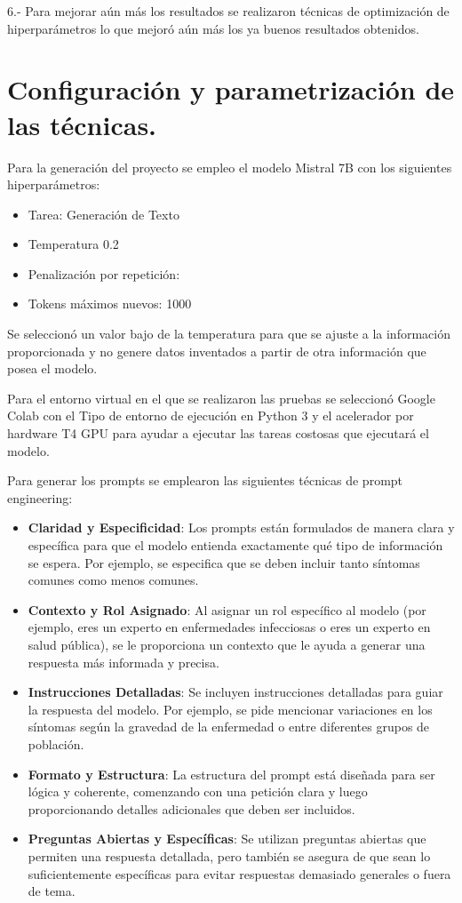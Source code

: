 6.- Para mejorar aún más los resultados se realizaron técnicas de optimización de hiperparámetros lo que mejoró aún más los ya buenos resultados obtenidos.


\section{Configuración y parametrización de las técnicas.}

Para la generación del proyecto se empleo el modelo Mistral 7B con los siguientes hiperparámetros: 

\begin{itemize}

    \item Tarea: Generación de Texto
    \item Temperatura 0.2
    \item Penalización por repetición: %
    \item Tokens máximos nuevos: 1000

\end{itemize}

Se seleccionó un valor bajo de la temperatura para que se ajuste a la información proporcionada y no genere datos inventados a partir de otra información que posea el modelo.

Para el entorno virtual en el que se realizaron las pruebas se seleccionó Google Colab con el Tipo de entorno de ejecución en Python 3 y el acelerador por hardware T4 GPU para ayudar a ejecutar las tareas costosas que ejecutará el modelo.

Para generar los prompts se emplearon las siguientes técnicas de prompt engineering:

\begin{itemize}
    \item \textbf{Claridad y Especificidad}: Los prompts están formulados de manera clara y específica para que el modelo entienda exactamente qué tipo de información se espera. Por ejemplo, se especifica que se deben incluir tanto síntomas comunes como menos comunes.
    \item \textbf{Contexto y Rol Asignado}: Al asignar un rol específico al modelo (por ejemplo, eres un experto en enfermedades infecciosas o eres un experto en salud pública), se le proporciona un contexto que le ayuda a generar una respuesta más informada y precisa.
    \item \textbf{Instrucciones Detalladas}: Se incluyen instrucciones detalladas para guiar la respuesta del modelo. Por ejemplo, se pide mencionar variaciones en los síntomas según la gravedad de la enfermedad o entre diferentes grupos de población.
    \item \textbf{Formato y Estructura}: La estructura del prompt está diseñada para ser lógica y coherente, comenzando con una petición clara y luego proporcionando detalles adicionales que deben ser incluidos.
    \item \textbf{Preguntas Abiertas y Específicas}: Se utilizan preguntas abiertas que permiten una respuesta detallada, pero también se asegura de que sean lo suficientemente específicas para evitar respuestas demasiado generales o fuera de tema.
\end{itemize}

